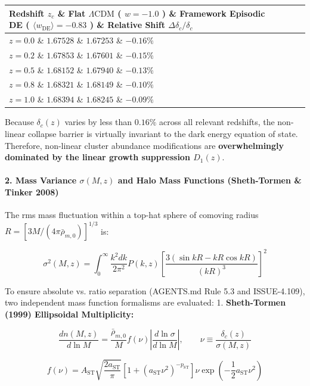\documentclass[11pt,a4paper]{article}
\theoremstyle{definition}\newtheorem{definition}{Definition}
\theoremstyle{remark}\newtheorem{remark}{Remark}
\begin{document}
\begin{longtable}{llll}
\hline
Redshift $z_c$ \& Flat $\Lambda\text{CDM}$ ( $w = -1.0$ ) \& Framework Episodic DE ( $\langle w_{\text{DE}} \rangle = -0.83$ ) \& Relative Shift $\Delta\delta_c / \delta_c$ \\
\hline
$z = 0.0$ \& $1.67528$ \& $1.67253$ \& $-0.16\%$ \\
$z = 0.2$ \& $1.67853$ \& $1.67601$ \& $-0.15\%$ \\
$z = 0.5$ \& $1.68152$ \& $1.67940$ \& $-0.13\%$ \\
$z = 0.8$ \& $1.68321$ \& $1.68149$ \& $-0.10\%$ \\
$z = 1.0$ \& $1.68394$ \& $1.68245$ \& $-0.09\%$ \\
\hline
\end{longtable}
Because $\delta_c(z)$ varies by less than $0.16\%$ across all relevant redshifts, the non-linear collapse barrier is virtually invariant to the dark energy equation of state. Therefore, non-linear cluster abundance modifications are \textbf{overwhelmingly dominated by the linear growth suppression $D_1(z)$}.
\paragraph{2. Mass Variance $\sigma(M, z)$ and Halo Mass Functions (Sheth-Tormen \& Tinker 2008)}

The rms mass fluctuation within a top-hat sphere of comoving radius $R = [3M / (4\pi \bar{\rho}_{m,0})]^{1/3}$ is:


\begin{equation}
\sigma^2(M, z) = \int_0^\infty \frac{k^2 dk}{2\pi^2} P(k, z) \left[ \frac{3(\sin kR - kR \cos kR)}{(kR)^3} \right]^2
\end{equation}


To ensure absolute vs. ratio separation (AGENTS.md Rule 5.3 and ISSUE-4.109), two independent mass function formalisms are evaluated:
1. \textbf{Sheth-Tormen (1999) Ellipsoidal Multiplicity:}


\begin{equation}
\frac{dn(M, z)}{d\ln M} = \frac{\bar{\rho}_{m,0}}{M} f(\nu) \left| \frac{d\ln\sigma}{d\ln M} \right|, \qquad \nu \equiv \frac{\delta_c(z)}{\sigma(M, z)}
\end{equation}



\begin{equation}
f(\nu) = A_{\text{ST}} \sqrt{\frac{2 a_{\text{ST}}}{\pi}} \left[ 1 + (a_{\text{ST}} \nu^2)^{-p_{\text{ST}}} \right] \nu \exp\left(-\frac{1}{2} a_{\text{ST}} \nu^2\right)
\end{equation}
\end{document}

